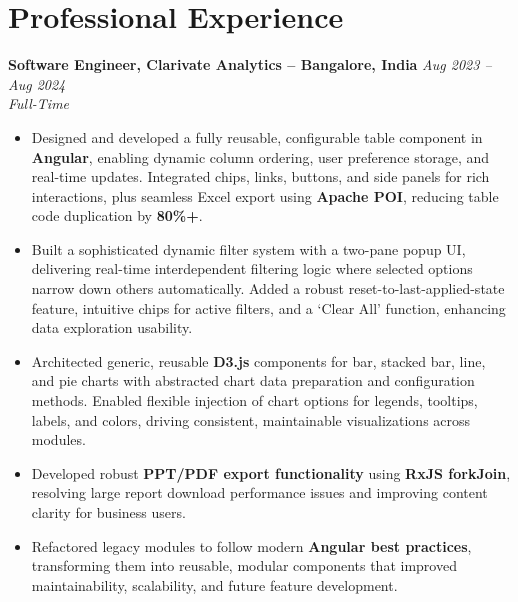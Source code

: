 \documentclass[10pt, letterpaper]{article}
\newenvironment{highlights}{\begin{itemize}[topsep=0.10 cm, parsep=0.10 cm, partopsep=0pt, itemsep=2pt, leftmargin=10pt]}{\end{itemize}}
\begin{document}
\newcommand{\experienceentry}[4]{%
  \noindent\textbf{#1} \hfill \textit{#2}\\
  \textit{#3} \\
  #4
  \vspace{0.3cm}
}

\section{Professional Experience}

\experienceentry
  {Software Engineer, Clarivate Analytics -- Bangalore, India}
  {Aug 2023 -- Aug 2024}
  {Full-Time}
  {
    \begin{highlights}
        \item Designed and developed a fully reusable, configurable table component in \textbf{Angular}, enabling dynamic column ordering, user preference storage, and real-time updates. Integrated chips, links, buttons, and side panels for rich interactions, plus seamless Excel export using \textbf{Apache POI}, reducing table code duplication by \textbf{80\%+}.

        \item Built a sophisticated dynamic filter system with a two-pane popup UI, delivering real-time interdependent filtering logic where selected options narrow down others automatically. Added a robust reset-to-last-applied-state feature, intuitive chips for active filters, and a ‘Clear All’ function, enhancing data exploration usability.
        
        \item Architected generic, reusable \textbf{D3.js} components for bar, stacked bar, line, and pie charts with abstracted chart data preparation and configuration methods. Enabled flexible injection of chart options for legends, tooltips, labels, and colors, driving consistent, maintainable visualizations across modules.
        
        
        \item Developed robust \textbf{PPT/PDF export functionality} using \textbf{RxJS forkJoin}, resolving large report download performance issues and improving content clarity for business users.
        
        \item Refactored legacy modules to follow modern \textbf{Angular best practices}, transforming them into reusable, modular components that improved maintainability, scalability, and future feature development.


\end{highlights}}
\end{document}
